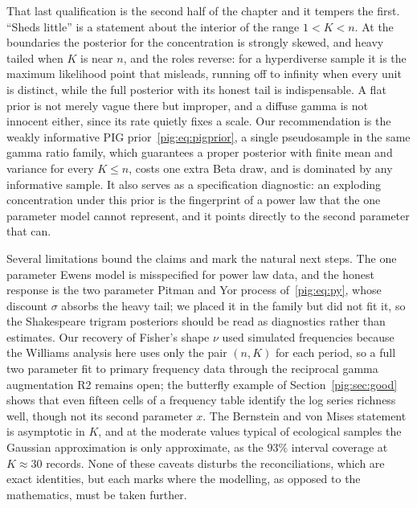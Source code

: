 That last qualification is the second half of the chapter and it tempers the first. ``Sheds little'' is a statement about the interior of the range $1<K<n$. At the boundaries the posterior for the concentration is strongly skewed, and heavy tailed when $K$ is near $n$, and the roles reverse: for a hyperdiverse sample it is the maximum likelihood point that misleads, running off to infinity when every unit is distinct, while the full posterior with its honest tail is indispensable. A flat prior is not merely vague there but improper, and a diffuse gamma is not innocent either, since its rate quietly fixes a scale. Our recommendation is the weakly informative PIG prior~\eqref{pig:eq:pigprior}, a single pseudosample in the same gamma ratio family, which guarantees a proper posterior with finite mean and variance for every $K\le n$, costs one extra Beta draw, and is dominated by any informative sample. It also serves as a specification diagnostic: an exploding concentration under this prior is the fingerprint of a power law that the one parameter model cannot represent, and it points directly to the second parameter that can.

Several limitations bound the claims and mark the natural next steps. The one parameter Ewens model is misspecified for power law data, and the honest response is the two parameter Pitman and Yor process of~\eqref{pig:eq:py}, whose discount $\sigma$ absorbs the heavy tail; we placed it in the family but did not fit it, so the Shakespeare trigram posteriors should be read as diagnostics rather than estimates. Our recovery of Fisher's shape $\nu$ used simulated frequencies because the Williams analysis here uses only the pair $(n,K)$ for each period, so a full two parameter fit to primary frequency data through the reciprocal gamma augmentation R2 remains open; the butterfly example of Section~\ref{pig:sec:good} shows that even fifteen cells of a frequency table identify the log series richness well, though not its second parameter $x$. The Bernstein and von Mises statement is asymptotic in $K$, and at the moderate values typical of ecological samples the Gaussian approximation is only approximate, as the $93\%$ interval coverage at $K\approx30$ records. None of these caveats disturbs the reconciliations, which are exact identities, but each marks where the modelling, as opposed to the mathematics, must be taken further.

